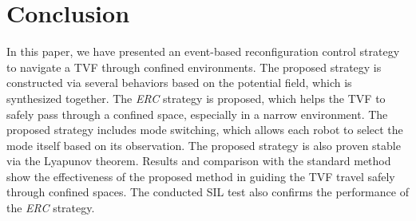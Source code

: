 \section{Conclusion}\label{sec5}
In this paper, we have presented an event-based reconfiguration control strategy to navigate a TVF through confined environments. The proposed strategy is constructed via several behaviors based on the potential field, which is synthesized together. The \textit{ERC} strategy is proposed, which helps the TVF to safely pass through a confined space, especially in a narrow environment. The proposed strategy includes mode switching, which allows each robot to select the mode itself based on its observation. The proposed strategy is also proven stable via the Lyapunov theorem. Results and comparison with the standard method show the effectiveness of the proposed method in guiding the TVF travel safely through confined spaces. The conducted SIL test also confirms the performance of the \textit{ERC} strategy.
